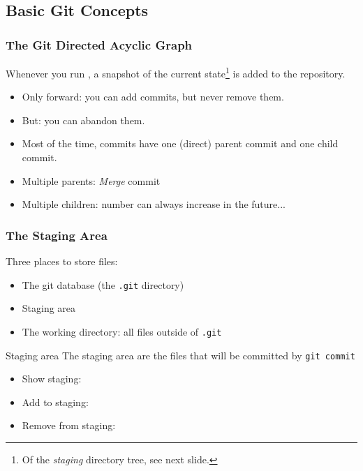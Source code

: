 \subsection{Basic Git Concepts}


\begin{frame}
  \frametitle{The Git Directed Acyclic Graph}

  Whenever you run , a snapshot of the current
  state\footnote{Of the \emph{staging} directory tree, see next
    slide.} is added to the repository.
  \begin{itemize}
  \item Only forward: you can add commits, but never remove them.
  \item But: you can abandon them.
  \item Most of the time, commits have one (direct) parent commit and
    one child commit.
  \item Multiple parents: \emph{Merge} commit
  \item Multiple children: number can always increase in the future...
  \end{itemize}
\end{frame}


{
  \begin{frame}[plain]
  \end{frame}
}


\begin{frame}
  \frametitle{The Staging Area}

  Three places to store files:
  \begin{itemize}
  \item The git database (the \texttt{.git} directory)
  \item Staging area
  \item The working directory: all files outside of \texttt{.git} 
  \end{itemize}

  \begin{block}{Staging area}
    The staging area are the files that will be committed by
    \texttt{git commit}
    \begin{itemize}
    \item Show staging: 
    \item Add to staging: 
    \item Remove from staging: 
    \end{itemize}
  \end{block}
\end{frame}




